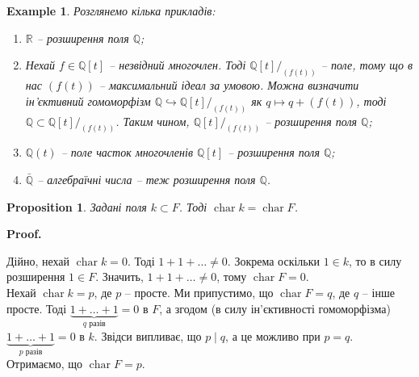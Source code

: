 \documentclass[a4paper, 10pt]{article}
\makeatletter
\theoremstyle{theoremdd}
\theoremstyle{theoremdd}
\theoremstyle{theoremdd}
\theoremstyle{theoremdd}
\theoremstyle{theoremdd}
\newtheorem{example}[theorem]{Example}
\theoremstyle{theoremdd}
\theoremstyle{theoremdd}
\theoremstyle{theoremdd}
\theoremstyle{theoremdd}
\newtheorem{proposition}[theorem]{Proposition}
\theoremstyle{theoremdd}
\theoremstyle{theoremdd}
\theoremstyle{theoremdd}
\theoremstyle{theoremdd}
\theoremstyle{theoremdd}
\theoremstyle{theoremdd}
\renewenvironment{proof}[1][Proof.\\]{\par
\pushQED{\hfill \qed}%
\normalfont \topsep6\p@\@plus6\p@\relax
\trivlist
\item\relax
{\bfseries
#1\@addpunct{.}}\hspace\labelsep\ignorespaces
}{%
\popQED\endtrivlist\@endpefalse
}
\DeclareMathOperator{\charac}{char}
\makeatother
\begin{document}
\begin{example}
Розглянемо кілька прикладів:
\begin{enumerate}[nosep, wide=0pt, label={\arabic*.}]
\item $\mathbb{R}$ -- розширення поля $\mathbb{Q}$;
\item Нехай $f \in \mathbb{Q}[t]$ -- незвідний многочлен. Тоді $\mathbb{Q}[t]/_{(f(t))}$ -- поле, тому що в нас $(f(t))$ -- максимальний ідеал за умовою. Можна визначити ін'єктивний гомоморфізм $\mathbb{Q} \hookrightarrow \mathbb{Q}[t]/_{(f(t))}$ як $q \mapsto q + (f(t))$, тоді $\mathbb{Q} \subset \mathbb{Q}[t]/_{(f(t))}$. Таким чином, $\mathbb{Q}[t]/_{(f(t))}$ -- розширення поля $\mathbb{Q}$;
\item $\mathbb{Q}(t)$ -- поле часток многочленів $\mathbb{Q}[t]$ -- розширення поля $\mathbb{Q}$;
\item $\bar{\mathbb{Q}}$ -- алгебраїчні числа -- теж розширення поля $\mathbb{Q}$.
\end{enumerate}
\end{example}

\begin{proposition}
Задані поля $k \subset F$. Тоді $\charac k = \charac F$.
\end{proposition}

\begin{proof}
Дійно, нехай $\charac k = 0$. Тоді $1 + 1 + \dots \neq 0$. Зокрема оскільки $1 \in k$, то в силу розширення $1 \in F$. Значить, $1 + 1 + \dots \neq 0$, тому $\charac F = 0$.\\
Нехай $\charac k = p$, де $p$ -- просте. Ми припустимо, що $\charac F = q$, де $q$ -- інше просте. Тоді $\underbrace{1+\dots+1}_{q \text{ разів}} = 0$ в $F$, а згодом (в силу ін'єктивності гомоморфізма) $\underbrace{1+\dots+1}_{p \text{ разів}} = 0$ в $k$. Звідси випливає, що $p \mid q$, а це можливо при $p = q$. Отримаємо, що $\charac F = p$.
\iffalse
Уже за умовою є ін'єктивний гомоморфізм $k \hookrightarrow F$. Відомо, що має існувати єдиний гомоморфізм $\mathbb{Z} \hookrightarrow F$ та $\mathbb{Z} \hookrightarrow k$. Отримаємо таку діаграму:\\
\begin{tikzcd}
k \arrow[hook]{r}{\jmath} \arrow[hook]{r}{\imath} & F \\
\mathbb{Z} \arrow{u}{\imath} \arrow{ru}{l} &
\end{tikzcd}\\
У силу єдиності $\imath, l$ ми маємо, що $\imath \circ \jmath = l$. з цього отримаємо $\ker \imath = \ker l$.
\fi
\end{proof}
\end{document}
